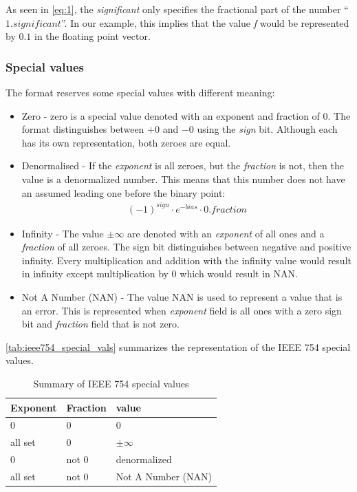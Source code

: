 \documentclass[10pt]{article}
\begin{document}
\noindent{}As seen in \autoref{eq:1}, the \textit{significant} only specifies the
fractional part of the number ``$1.significant$''. In our example, this implies that
the value \textit{f} would be represented by $0.1$ in the floating point vector.

\subsubsection{Special values}\label{sec:special-values}

The format reserves some special values with different meaning:
\begin{itemize}
  \item Zero - zero is a special value denoted with an exponent and fraction of
  0. The format distinguishes between $+0$ and $-0$ using the \textit{sign} bit.
  Although each has its own representation, both zeroes are equal.
  \item Denormalised - If the \textit{exponent} is all zeroes, but the
  \textit{fraction} is not, then the value is a denormalized number. This means
  that this number does not have an assumed leading one before the binary point:
  \begin{align*}
    (-1)^{sign} \cdot e^{-bias} \cdot 0.fraction
  \end{align*}
  \item Infinity - The value $\pm \infty$ are denoted with an \textit{exponent} of all
  ones and a \textit{fraction} of all zeroes. The sign bit distinguishes between
  negative and positive infinity. Every multiplication and addition with the
  infinity value would result in infinity except multiplication by 0 which would
  result in NAN.
  \item Not A Number (NAN) - The value NAN is used to represent a value that is
  an error. This is represented when \textit{exponent} field is all ones with a
  zero sign bit and \textit{fraction} field that is not zero.

\end{itemize}

\autoref{tab:ieee754_special_vals} summarizes the representation of the IEEE 754
special values.

\begin{table}[h]\centering
  
  \begin{tabular}{|l|l|l|}
    \hline
    Exponent & Fraction & value \\
    \hline
    0 & 0 & 0 \\
    \hline
    all set & 0 & $\pm \infty$ \\
    \hline
    0 & not 0 & denormalized \\
    \hline
    all set & not 0 & Not A Number (NAN) \\
    \hline
  \end{tabular}
  
  \caption{Summary of IEEE 754 special values}
  \label{tab:ieee754_special_vals}
\end{table}
\end{document}
